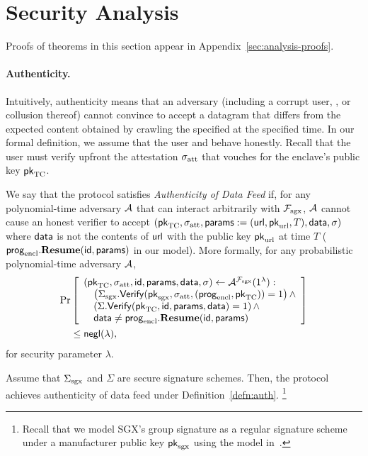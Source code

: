 \section{Security Analysis}
\label{sec:analysis}

Proofs of theorems in this section appear in Appendix~\ref{sec:analysis-proofs}.


\paragraph{Authenticity.}
Intuitively, authenticity means that an adversary (including a corrupt user, \medname, or collusion thereof)
cannot convince \tcont to accept a datagram that differs from the expected content obtained by crawling the specified \weburl at the specified time.
In our formal definition, we assume that the user and \tcont behave honestly.
Recall that the user must verify upfront the attestation ${\sigma_{\textrm{att}}}$ that vouches for the enclave's public key ${\sf pk}_{\textrm{TC}}$.

\begin{definition}
\label{defn:auth}
We say that the \tc protocol satisfies \emph{Authenticity of Data Feed} if,
for any polynomial-time adversary $\mathcal{A}$ that can interact arbitrarily with $\mathcal{F}_{\textrm{sgx}}$,
$\mathcal{A}$ cannot cause an honest verifier to accept $({\sf pk}_{\textrm{TC}}, {\sigma_{\textrm{att}}}, {\sf params}:=({{\sf url}}, {\sf pk}_{\textrm{url}}, T), {\sf data}, \sigma)$
where ${\sf data}$ is not the contents of ${{\sf url}}$ with the public key ${\sf pk}_{\textrm{url}}$ at time $T$ (${\sf prog}_{\textrm{encl}}.{\bf Resume}({\sf id}, {\sf params})$ in our model).
More formally, for any probabilistic polynomial-time adversary $\mathcal{A}$,
\begin{align*}
  \Pr & \left[
\begin{array}{l}
({\sf pk}_{\textrm{TC}}, {\sigma_{\textrm{att}}}, {\sf id}, {\sf params}, {\sf data}, \sigma) \leftarrow 
\mathcal{A}^{\mathcal{F}_{\textrm{sgx}}}(1^\lambda) :\\
\quad \left({\Sigma_{\textrm{sgx}}}.{\sf Verify}({\sf pk}_{\mathrm{sgx}}, {\sigma_{\textrm{att}}}, ({\sf prog}_{\textrm{encl}}, {\sf pk}_{\textrm{TC}})) = 1\right) \wedge \\
\quad \left(\Sigma.{\sf Verify}({\sf pk}_{\textrm{TC}}, {\sf id}, {\sf params}, {\sf data})  = 1\right) \wedge\\
\quad {\sf data} \neq {\sf prog}_{\textrm{encl}}.{\bf Resume}({\sf id}, {\sf params})
\end{array}
\right] \\
& \leq {\sf negl}(\lambda),
\end{align*}
for security parameter $\lambda$.
\end{definition}

\begin{theorem}[Authenticity]
\label{thm:authenticity}
Assume that ${\Sigma_{\textrm{sgx}}}$ and $\Sigma$ are secure signature schemes.
Then, the \tc protocol achieves authenticity of data feed under Definition~\ref{defn:auth}.%
\footnote{Recall that we model SGX's group signature as a regular signature scheme under a manufacturer public key ${\sf pk}_{\mathrm{sgx}}$ using the model in~\cite{sgxsok}.}
\end{theorem}




